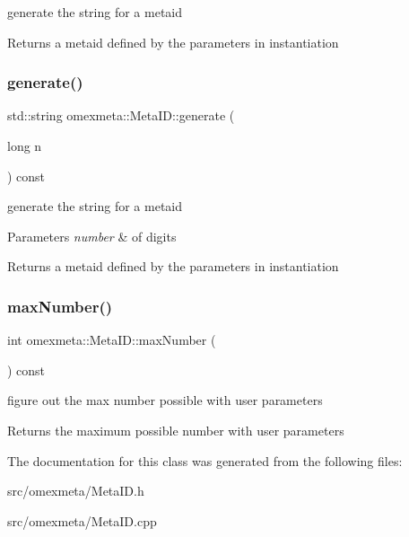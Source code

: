 generate the string for a metaid 

\begin{DoxyReturn}{Returns}
a metaid defined by the parameters in instantiation 
\end{DoxyReturn}
\mbox{\label{classomexmeta_1_1MetaID_a9a3c9b479d522e7630275d85582edd26}} 
\subsubsection{\texorpdfstring{generate()}{generate()}\hspace{0.1cm}{\footnotesize\ttfamily [2/2]}}
{\footnotesize\ttfamily std\+::string omexmeta\+::\+Meta\+I\+D\+::generate (\begin{DoxyParamCaption}\item[{long}]{n }\end{DoxyParamCaption}) const}



generate the string for a metaid 


\begin{DoxyParams}{Parameters}
{\em number} & of digits \\
\hline
\end{DoxyParams}
\begin{DoxyReturn}{Returns}
a metaid defined by the parameters in instantiation 
\end{DoxyReturn}
\mbox{\label{classomexmeta_1_1MetaID_a343f4b48c9673f8943e03057370f01e4}} 
\subsubsection{\texorpdfstring{max\+Number()}{maxNumber()}}
{\footnotesize\ttfamily int omexmeta\+::\+Meta\+I\+D\+::max\+Number (\begin{DoxyParamCaption}{ }\end{DoxyParamCaption}) const}



figure out the max number possible with user parameters 

\begin{DoxyReturn}{Returns}
the maximum possible number with user parameters 
\end{DoxyReturn}


The documentation for this class was generated from the following files\+:\begin{DoxyCompactItemize}
\item 
src/omexmeta/Meta\+I\+D.\+h\item 
src/omexmeta/Meta\+I\+D.\+cpp\end{DoxyCompactItemize}
